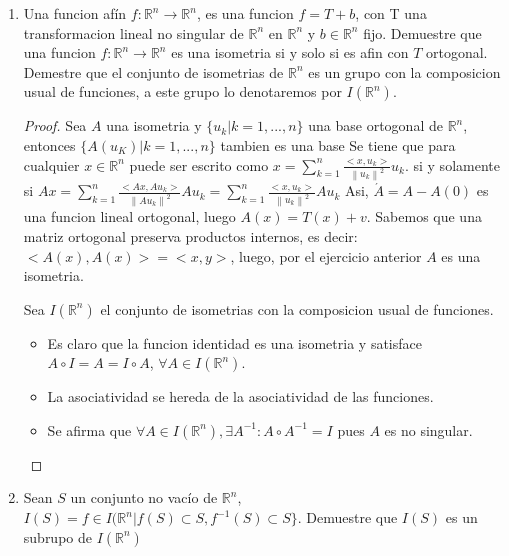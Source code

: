 \documentclass{article}
\theoremstyle{break}
\begin{document}
\begin{enumerate}
\begin{proof}
			\end{proof}
			
		\item Una funcion af\'in $f:\mathbb{R}^n\rightarrow\mathbb{R}^n$, es una funcion $f=T+b$, con T una transformacion lineal no singular de $\mathbb{R}^n$ en $\mathbb{R}^n$ y $b\in\mathbb{R}^n$ fijo. Demuestre que una funcion $f:\mathbb{R}^n\rightarrow\mathbb{R}^n$ es una isometria si y solo si es afin con $T$ ortogonal. Demestre que el conjunto de isometrias de $\mathbb{R}^n$ es un grupo con la composicion usual de funciones, a este grupo lo denotaremos por $I(\mathbb{R}^n)$.
		
		\begin{proof}
			Sea $A$ una isometria y $\{u_k|k=1,...,n\}$ una base ortogonal de $\mathbb{R}^n$, entonces $\{A(u_K)|k=1,...,n\}$ tambien es una base
			Se tiene que para cualquier $x\in\mathbb{R}^n$ puede ser escrito como $x=\displaystyle\sum_{k=1}^{n}{\frac{<x,u_k>}{\left\| u_k\right\|^2}u_k}$. si y solamente si $Ax=\displaystyle\sum_{k=1}^{n}{\frac{<Ax, Au_k>}{\left\| Au_k\right\|^2}Au_k}=\displaystyle\sum_{k=1}^{n}{\frac{<x,u_k>}{\left\| u_k\right\|^2}Au_k}$ Asi, $\acute{A}=A-A(0)$ es una funcion lineal ortogonal, luego $A(x)=T(x)+v$.
			Sabemos que una matriz ortogonal preserva productos internos, es decir: $<A(x),A(x)>=<x,y>$, luego, por el ejercicio anterior $A$ es una isometria.
			
			Sea $I(\mathbb{R}^n)$ el conjunto de isometrias con la composicion usual de funciones. 
			
			\begin{itemize}
				\item Es claro que la funcion identidad es una isometria y satisface $A\circ I=A=I\circ A$, $\forall A\in I(\mathbb{R}^n)$. 
				
				\item La asociatividad se hereda de la asociatividad de las funciones.
				
				\item Se afirma que $\forall A\in I(\mathbb{R}^n), \exists A^{-1}: A\circ A^{-1}=I$ pues $A$ es no singular.
			\end{itemize}
			
		\end{proof}
		
		\item Sean $S$ un conjunto no vac\'io de $\mathbb{R}^n$, $I(S)= f\in I(\mathbb{R}^n| f(S)\subset S, f^{-1}(S)\subset S\}$. Demuestre que $I(S)$ es un subrupo de $I(\mathbb{R}^n)$
			

\end{enumerate}
\end{document}
